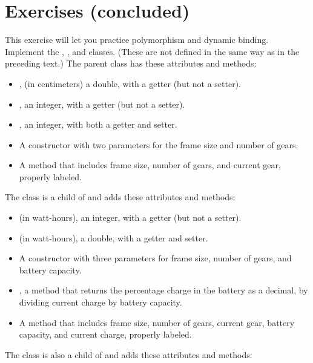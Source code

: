 \section{Exercises (concluded)}

\begin{exercise}
This exercise will let you practice polymorphism and dynamic binding. Implement the , , and  classes. (These are not defined in the same way as in the preceding text.) The parent  class has these attributes and methods: 

\begin{itemize}
\item {}, (in centimeters) a double, with a getter (but not a setter).
\item {}, an integer, with a getter (but not a setter).
\item {}, an integer, with both a getter and setter.
\item A constructor with two parameters for the frame size and number of gears.
\item A  method that includes frame size, number of gears, and current gear, properly labeled.
\end{itemize}

The  class is a child of  and adds these attributes and methods:

\begin{itemize}
\item {} (in watt-hours), an integer, with a getter (but not a setter).
\item {} (in watt-hours), a double, with a getter and setter.
\item A constructor with three parameters for frame size, number of gears, and battery capacity.
\item {}, a method that returns the percentage charge in the battery as a decimal, by dividing current charge by battery capacity.
\item A  method that includes frame size, number of gears, current gear, battery capacity, and current charge, properly labeled.
\end{itemize}

The  class is also a child of  and adds these attributes and methods:


\end{exercise}
